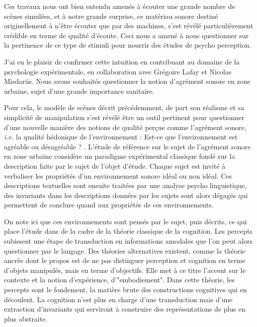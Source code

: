   Ces travaux nous ont bien entendu amenés à écouter une grande nombre de scènes simulées, et à notre grande surprise, ce matériau sonore destiné originellement à n'être écouter que par des machines, s'est révélé particulièrement crédible en terme de qualité d'écoute. Ceci nous a amené à nous questionner sur la pertinence de ce type de stimuli pour nourrir des études de psycho perception.

  J'ai eu le plaisir de confirmer cette intuition en contribuant au domaine de la psychologie expérimentale, en collaboration avec Grégoire Lafay et Nicolas Misdariis. Nous avons souhaités questionner la notion d'agrément sonore en zone urbaine, sujet d'une grande importance sanitaire.

  Pour cela, le modèle de scènes décrit précédemment, de part son réalisme et sa simplicité de manipulation s'est révélé être un outil pertinent pour questionner d'une nouvelle manière des notions de qualité perçue comme l'agrément sonore, \textit{i.e.} la qualité hédonique de l’environnement : \og Est-ce que l’environnement est agréable ou désagréable ? \fg. L'étude de référence sur le sujet de l'agrément sonore en zone urbaine\cite{guastavino2006ideal} considère un paradigme expérimental classique fondé sur la description faite par le sujet de l'objet d'étude. Chaque sujet est invité à verbaliser les propriétés d'un environnement sonore idéal ou non idéal. Ces descriptions textuelles sont ensuite traitées par une analyse psycho linguistique, des invariants dans les descriptions données par les sujets sont alors dégagés qui permettent de conclure quand aux propriétés de ces environnements.

  On note ici que ces environnements sont pensés par le sujet, puis décrits, ce qui place l'étude dans de la cadre de la théorie classique de la cognition. Les percepts subissent une étape de transduction en informations amodales que l'on peut alors questionner par le langage. Des théories alternatives existent, comme la théorie ancrée\cite{barsalou2010grounded} dont le propos est de ne pas distinguer perception et cognition en terme d'objets manipulés, mais en terme d'objectifs. Elle met à ce titre l'accent sur le contexte et la notion d'expérience, d'"embodiement". Dans cette théorie, les percepts sont le fondement, la matière brute des constructions cognitives qui en découlent. La cognition n'est plus en charge d'une transduction mais d'une extraction d'invariants qui serviront à construire des représentations de plus en plus abstraite.

